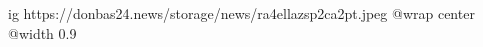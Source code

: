  
 
 
 
 

\ifcmt
  ig https://donbas24.news/storage/news/ra4ellazsp2ca2pt.jpeg
  @wrap center
  @width 0.9
\fi
